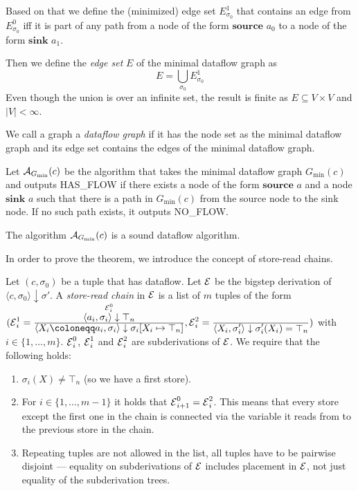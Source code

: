 Based on that we define the (minimized) edge set $E^1_{\sigma_0}$
that contains an edge from $E^0_{\sigma_0}$ iff it is part of any path 
from a node of the form $\textbf{source }a_0$
to a node of the form $\textbf{sink }a_1$.

Then we define the \emph{edge set} $E$ of the minimal dataflow graph as
\begin{equation*}
    E = \bigcup_{\sigma_0} E^1_{\sigma_0}
\end{equation*}
Even though the union is over an infinite set, the result is finite
as $E \subseteq V \times V$ and $|V| < \infty$.

We call a graph a \emph{dataflow graph} if it has the node set as the minimal
dataflow graph and its edge set contains the edges of the minimal dataflow 
graph.

Let $\operatorname{\mathcal{A}}_{G_\text{min}}(c)$ be the algorithm that takes the
minimal dataflow graph $G_\text{min}(c)$ and outputs HAS\_FLOW if there 
exists a node of the form 
$\textbf{source }a$ and a node $\textbf{sink }a$ such that there is a path in 
$G_\text{min}(c)$ from the source node to the sink node.
If no such path exists, it outputs NO\_FLOW.


\begin{theorem}
    \label{thm:min-dg}
    The algorithm $\operatorname{\mathcal{A}}_{G_\text{min}}(c)$ is a sound dataflow algorithm.
\end{theorem}
In order to prove the theorem, we introduce the concept of store-read chains.

\begin{definition}
    Let $(c, \sigma_0)$ be a tuple that has dataflow.
    Let $\operatorname{\mathcal{E}}$ be the bigstep derivation of
    $\langle c, \sigma_0 \rangle \downarrow \sigma'$.
    A \emph{store-read chain} in $\operatorname{\mathcal{E}}$ is a list of $m$ tuples of the form
    $(\E^1_i=\ddfrac{\overset{\E^0_i}{\langle a_i, \sigma_i \rangle \downarrow \top_n}}
    {\langle X_i \coloneqq a_i, \sigma_i \rangle \downarrow \sigma_i[X_i \mapsto \top_n]},
    \E^2_i=\ddfrac{}{\langle X_i, \sigma_i' \rangle \downarrow \sigma_i'(X_i) = \top_n})$
    with $i \in \{1, \ldots, m\}$.
    $\operatorname{\mathcal{E}}^0_i$, $\operatorname{\mathcal{E}}^1_i$ and $\operatorname{\mathcal{E}}^2_i$ are subderivations of $\operatorname{\mathcal{E}}$.
    We require that the following holds:
    \begin{enumerate}
        \item $\sigma_i(X) \neq \top_n$ (so we have a first store). 
        \item For $i \in \{1, \ldots, m-1\}$ it holds that 
        $\operatorname{\mathcal{E}}^0_{i+1}=\operatorname{\mathcal{E}}^2_i$. This means that every store except the first one
        in the chain is connected via the variable it reads from to the previous 
        store in the chain.
        \item Repeating tuples are not allowed in the list, all tuples have to 
        be pairwise disjoint --- equality on subderivations of $\operatorname{\mathcal{E}}$ includes
        placement in $\operatorname{\mathcal{E}}$, not just equality of the subderivation trees.
    \end{enumerate}
\end{definition}

